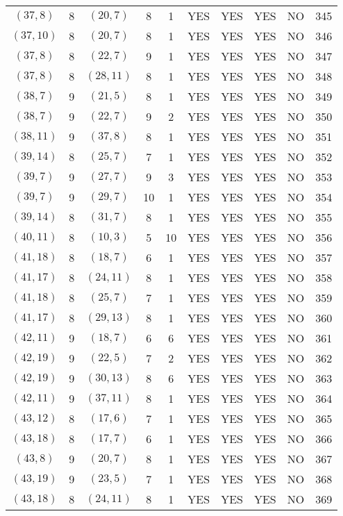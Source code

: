 \begin{longtable}{|c|c|c|c|c|c|c|c|c|c|}
$(37, 8)$ & 8 & $(20, 7)$ & 8 & 1 & YES & YES & YES & NO & 345\\
$(37, 10)$ & 8 & $(20, 7)$ & 8 & 1 & YES & YES & YES & NO & 346\\
$(37, 8)$ & 8 & $(22, 7)$ & 9 & 1 & YES & YES & YES & NO & 347\\
$(37, 8)$ & 8 & $(28, 11)$ & 8 & 1 & YES & YES & YES & NO & 348\\
$(38, 7)$ & 9 & $(21, 5)$ & 8 & 1 & YES & YES & YES & NO & 349\\
$(38, 7)$ & 9 & $(22, 7)$ & 9 & 2 & YES & YES & YES & NO & 350\\
$(38, 11)$ & 9 & $(37, 8)$ & 8 & 1 & YES & YES & YES & NO & 351\\
$(39, 14)$ & 8 & $(25, 7)$ & 7 & 1 & YES & YES & YES & NO & 352\\
$(39, 7)$ & 9 & $(27, 7)$ & 9 & 3 & YES & YES & YES & NO & 353\\
$(39, 7)$ & 9 & $(29, 7)$ & 10 & 1 & YES & YES & YES & NO & 354\\
$(39, 14)$ & 8 & $(31, 7)$ & 8 & 1 & YES & YES & YES & NO & 355\\
$(40, 11)$ & 8 & $(10, 3)$ & 5 & 10 & YES & YES & YES & NO & 356\\
$(41, 18)$ & 8 & $(18, 7)$ & 6 & 1 & YES & YES & YES & NO & 357\\
$(41, 17)$ & 8 & $(24, 11)$ & 8 & 1 & YES & YES & YES & NO & 358\\
$(41, 18)$ & 8 & $(25, 7)$ & 7 & 1 & YES & YES & YES & NO & 359\\
$(41, 17)$ & 8 & $(29, 13)$ & 8 & 1 & YES & YES & YES & NO & 360\\
$(42, 11)$ & 9 & $(18, 7)$ & 6 & 6 & YES & YES & YES & NO & 361\\
$(42, 19)$ & 9 & $(22, 5)$ & 7 & 2 & YES & YES & YES & NO & 362\\
$(42, 19)$ & 9 & $(30, 13)$ & 8 & 6 & YES & YES & YES & NO & 363\\
$(42, 11)$ & 9 & $(37, 11)$ & 8 & 1 & YES & YES & YES & NO & 364\\
$(43, 12)$ & 8 & $(17, 6)$ & 7 & 1 & YES & YES & YES & NO & 365\\
$(43, 18)$ & 8 & $(17, 7)$ & 6 & 1 & YES & YES & YES & NO & 366\\
$(43, 8)$ & 9 & $(20, 7)$ & 8 & 1 & YES & YES & YES & NO & 367\\
$(43, 19)$ & 9 & $(23, 5)$ & 7 & 1 & YES & YES & YES & NO & 368\\
$(43, 18)$ & 8 & $(24, 11)$ & 8 & 1 & YES & YES & YES & NO & 369\\

\end{longtable}
